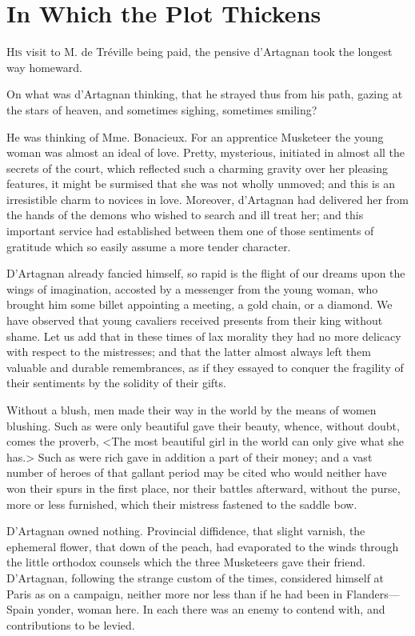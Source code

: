 
\chapter{In Which the Plot Thickens}

\lettrine[]{H}{is} visit to M. de Tréville being paid, the pensive d'Artagnan took the longest way homeward. 

\zz
On what was d'Artagnan thinking, that he strayed thus from his path, gazing at the stars of heaven, and sometimes sighing, sometimes smiling? 

He was thinking of Mme. Bonacieux. For an apprentice Musketeer the young woman was almost an ideal of love. Pretty, mysterious, initiated in almost all the secrets of the court, which reflected such a charming gravity over her pleasing features, it might be surmised that she was not wholly unmoved; and this is an irresistible charm to novices in love. Moreover, d'Artagnan had delivered her from the hands of the demons who wished to search and ill treat her; and this important service had established between them one of those sentiments of gratitude which so easily assume a more tender character. 

D'Artagnan already fancied himself, so rapid is the flight of our dreams upon the wings of imagination, accosted by a messenger from the young woman, who brought him some billet appointing a meeting, a gold chain, or a diamond. We have observed that young cavaliers received presents from their king without shame. Let us add that in these times of lax morality they had no more delicacy with respect to the mistresses; and that the latter almost always left them valuable and durable remembrances, as if they essayed to conquer the fragility of their sentiments by the solidity of their gifts. 

Without a blush, men made their way in the world by the means of women blushing. Such as were only beautiful gave their beauty, whence, without doubt, comes the proverb, <The most beautiful girl in the world can only give what she has.> Such as were rich gave in addition a part of their money; and a vast number of heroes of that gallant period may be cited who would neither have won their spurs in the first place, nor their battles afterward, without the purse, more or less furnished, which their mistress fastened to the saddle bow. 

D'Artagnan owned nothing. Provincial diffidence, that slight varnish, the ephemeral flower, that down of the peach, had evaporated to the winds through the little orthodox counsels which the three Musketeers gave their friend. D'Artagnan, following the strange custom of the times, considered himself at Paris as on a campaign, neither more nor less than if he had been in Flanders---Spain yonder, woman here. In each there was an enemy to contend with, and contributions to be levied. 

